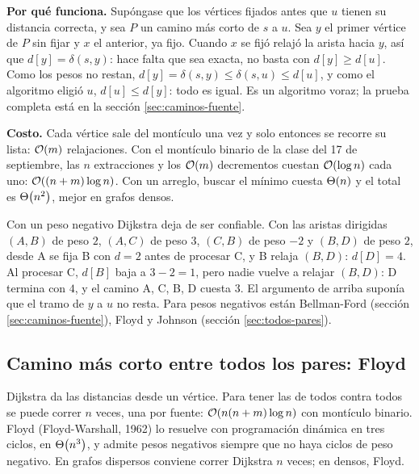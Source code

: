 \documentclass[11pt,letterpaper]{article}
\begin{document}
\textbf{Por qué funciona.} Supóngase que los vértices fijados antes
que $u$ tienen su distancia correcta, y sea $P$ un camino más corto
de $s$ a $u$. Sea $y$ el primer vértice de $P$ sin fijar y $x$ el
anterior, ya fijo. Cuando $x$ se fijó relajó la arista hacia $y$, así
que $d[y] = \delta(s, y)$: hace falta que sea exacta, no basta con
$d[y] \geq d[u]$. Como los pesos no restan,
$d[y] = \delta(s, y) \leq \delta(s, u) \leq d[u]$, y como el
algoritmo eligió $u$, $d[u] \leq d[y]$: todo es igual. Es un
algoritmo voraz; la prueba completa está en la
sección \ref{sec:caminos-fuente}.

\textbf{Costo.} Cada vértice sale del montículo una vez y solo
entonces se recorre su lista: $\mathcal{O}\!\left(m\right)$ relajaciones. Con el montículo
binario de la clase del 17 de septiembre, las $n$ extracciones y los
$\mathcal{O}\!\left(m\right)$ decrementos cuestan $\mathcal{O}\!\left(\log n\right)$ cada uno:
$\mathcal{O}\!\left((n + m) \log n\right)$. Con un arreglo, buscar el mínimo cuesta
$\Theta\!\left(n\right)$ y el total es $\Theta\!\left(n^2\right)$, mejor en grafos densos.

\begin{ojo}
  Con un peso negativo Dijkstra deja de ser confiable. Con las aristas
  dirigidas $(A, B)$ de peso $2$, $(A, C)$ de peso $3$, $(C, B)$ de
  peso $-2$ y $(B, D)$ de peso $2$, desde A se fija B con $d = 2$
  antes de procesar C, y B relaja $(B, D)$: $d[D] = 4$. Al procesar
  C, $d[B]$ baja a $3 - 2 = 1$, pero nadie vuelve a relajar $(B, D)$:
  D termina con $4$, y el camino A, C, B, D cuesta $3$. El argumento
  de arriba suponía que el tramo de $y$ a $u$ no resta. Para pesos
  negativos están Bellman-Ford (sección \ref{sec:caminos-fuente}),
  Floyd y Johnson (sección \ref{sec:todos-pares}).
\end{ojo}


\subsection*{Camino más corto entre todos los pares: Floyd}

Dijkstra da las distancias desde un vértice. Para tener las de todos
contra todos se puede correr $n$ veces, una por fuente:
$\mathcal{O}\!\left(n (n + m) \log n\right)$ con montículo binario. Floyd
(Floyd-Warshall, 1962) lo resuelve con programación dinámica en tres
ciclos, en $\Theta\!\left(n^3\right)$, y admite pesos negativos siempre que no haya
ciclos de peso negativo. En grafos dispersos conviene correr Dijkstra
$n$ veces; en densos, Floyd.
\end{document}
